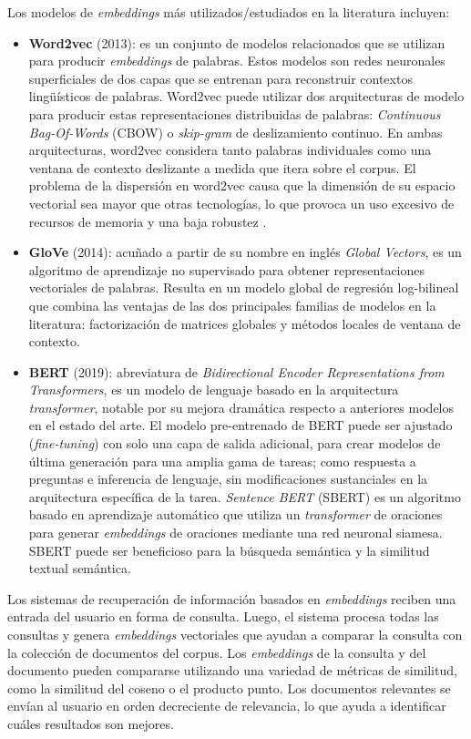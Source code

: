 Los modelos de \textit{embeddings} más utilizados/estudiados en la literatura incluyen:
\begin{itemize}
    \item \textbf{Word2vec} \cite{Mikolov2013EfficientEO} (2013): es un conjunto de modelos relacionados que se utilizan para producir \textit{embeddings} de palabras. Estos modelos son redes neuronales superficiales de dos capas que se entrenan para reconstruir contextos lingüísticos de palabras. Word2vec puede utilizar dos arquitecturas de modelo para producir estas representaciones distribuidas de palabras: \textit{Continuous Bag-Of-Words} (CBOW) o \textit{skip-gram} de deslizamiento continuo. En ambas arquitecturas, word2vec considera tanto palabras individuales como una ventana de contexto deslizante a medida que itera sobre el corpus. El problema de la dispersión en word2vec causa que la dimensión de su espacio vectorial sea mayor que otras tecnologías, lo que provoca un uso excesivo de recursos de memoria y una baja robustez \cite{Yuan2020ImprovingIR}.
    \item \textbf{GloVe} \cite{Pennington2014GloVeGV} (2014): acuñado a partir de su nombre en inglés \textit{Global Vectors}, es un algoritmo de aprendizaje no supervisado para obtener representaciones vectoriales de palabras. Resulta en un modelo global de regresión log-bilineal que combina las ventajas de las dos principales familias de modelos en la literatura: factorización de matrices globales y métodos locales de ventana de contexto.
    \item \textbf{BERT} \cite{Devlin2019BERTPO} (2019): abreviatura de \textit{Bidirectional Encoder Representations from Transformers}, es un modelo de lenguaje basado en la arquitectura \textit{transformer}, notable por su mejora dramática respecto a anteriores modelos en el estado del arte. El modelo pre-entrenado de BERT puede ser ajustado (\textit{fine-tuning}) con solo una capa de salida adicional, para crear modelos de última generación para una amplia gama de tareas; como respuesta a preguntas e inferencia de lenguaje, sin modificaciones sustanciales en la arquitectura específica de la tarea. \textit{Sentence BERT} (SBERT) \cite{Reimers2019SentenceBERTSE} es un algoritmo basado en aprendizaje automático que utiliza un \textit{transformer} de oraciones para generar \textit{embeddings} de oraciones mediante una red neuronal siamesa. SBERT puede ser beneficioso para la búsqueda semántica y la similitud textual semántica.
\end{itemize}

Los sistemas de recuperación de información basados en \textit{embeddings} reciben una entrada del usuario en forma de consulta. Luego, el sistema procesa todas las consultas y genera \textit{embeddings} vectoriales que ayudan a comparar la consulta con la colección de documentos del corpus. Los \textit{embeddings} de la consulta y del documento pueden compararse utilizando una variedad de métricas de similitud, como la similitud del coseno o el producto punto. Los documentos relevantes se envían al usuario en orden decreciente de relevancia, lo que ayuda a identificar cuáles resultados son mejores.
